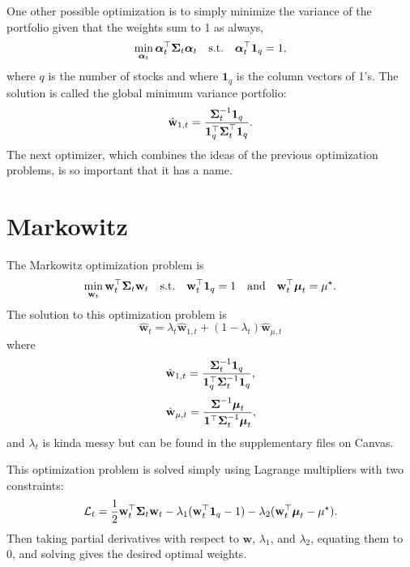 One other possible optimization is to simply minimize the variance of the portfolio given that the weights sum to 1 as always, $$ \min_{\boldsymbol{\alpha}_t}\boldsymbol{\alpha}_t^\top\boldsymbol{\Sigma}_t\boldsymbol{\alpha}_t\quad\text{s.t.}\quad\boldsymbol{\alpha}_t^\top\mathbf 1_q=1, $$ where $q$ is the number of stocks and where $\mathbf 1_q$ is the column vectors of 1's. The solution is called the global minimum variance portfolio: $$ \hat{\mathbf w}_{1,t} = \frac{\boldsymbol{\Sigma}_t^{-1}\mathbf 1_q}{\mathbf 1_q^\top\boldsymbol{\Sigma}_t^\top\mathbf 1_q}. $$ The next optimizer, which combines the ideas of the previous optimization problems, is so important that it has a name.

\section{Markowitz}
The Markowitz optimization problem is $$ \min_{\mathbf w_t}\mathbf w_t^\top\boldsymbol{\Sigma}_t\mathbf w_t\quad\text{s.t.}\quad\mathbf w_t^\top\mathbf 1_q=1\quad\text{and}\quad\mathbf w_t^\top \boldsymbol{\mu}_t=\mu^\star. $$ The solution to this optimization problem is $$ \hat{\mathbf w}_t = \lambda_t\hat{\mathbf w}_{1,t} + (1-\lambda_t)\hat{\mathbf w}_{\mu,t} $$ where $$ \hat{\mathbf w}_{1,t} = \frac{\boldsymbol{\Sigma}_t^{-1}\mathbf 1_q}{\mathbf 1_q^\top\mathbf\Sigma_t^{-1}\mathbf 1_q}, $$ $$ \hat{\mathbf w}_{\mu,t} = \frac{\boldsymbol{\Sigma}^{-1}\boldsymbol{\mu}_t}{\mathbf 1^\top\boldsymbol{\Sigma}_t^{-1}\boldsymbol{\mu}_t}, $$ and $\lambda_t$ is kinda messy but can be found in the supplementary files on Canvas.


This optimization problem is solved simply using Lagrange multipliers with two constraints: $$ \mathcal L_t = \frac{1}{2}\mathbf w_t^\top\boldsymbol{\Sigma}_t\mathbf w_t - \lambda_1(\mathbf w_t^\top\mathbf 1_q-1) - \lambda_2(\mathbf w_t^\top\boldsymbol{\mu}_t-\mu^\star). $$ Then taking partial derivatives with respect to $\mathbf w$, $\lambda_1$, and $\lambda_2$, equating them to 0, and solving gives the desired optimal weights.

